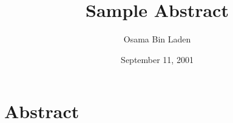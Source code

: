 \documentclass[a4paper]{article}
\title{Sample Abstract}
\author{Osama Bin Laden}
\date{September 11, 2001}
\begin{document}
\maketitle
    \section*{Abstract}
    \lipsum[6]
    \bigskip
    \lipsum[10]
\end{document}
